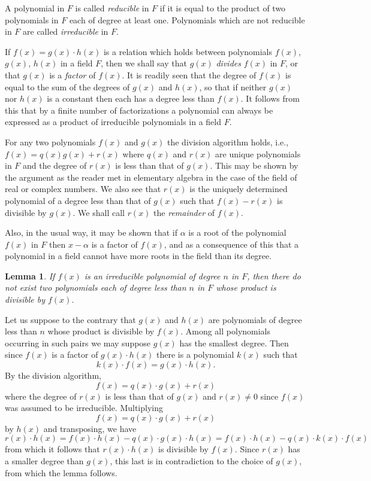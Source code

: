 \documentclass[11pt]{article}
\newtheorem*{lemm}{Lemma}
\theoremstyle{definition}
\begin{document}
A polynomial in $F$ is called \emph{reducible} in $F$ if it is equal to the product of two polynomials in $F$ each of degree at least one.
Polynomials which are not reducible in $F$ are called \emph{irreducible} in $F$.

If $f(x) = g(x) \cdot h(x)$ is a relation which holds between polynomials $f(x)$, $g(x)$, $h(x)$ in a field $F$, then we shall say that $g(x)$ \emph{divides} $f(x)$ in $F$, or that $g(x)$ is a \emph{factor} of $f(x)$.
It is readily seen that the degree of $f(x)$ is equal to the sum of the degrees of $g(x)$ and $h(x)$, so that if neither $g(x)$ nor $h(x)$ is a constant then each has a degree less than $f(x)$.
It follows from this that by a finite number of factorizations a polynomial can always be expressed as a product of irreducible polynomials in a field $F$.

For any two polynomials $f(x)$ and $g(x)$ the division algorithm holds, i.e., $f(x) = q(x) g(x) + r(x)$ where $q(x)$ and $r(x)$ are unique polynomials in $F$ and the degree of $r(x)$ is less than that of $g(x)$.
This may be shown by the argument as the reader met in elementary algebra in the case of the field of real or complex numbers.
We also see that $r(x)$ is the uniquely determined polynomial of a degree less than that of $g(x)$ such that $f(x) - r(x)$ is divisible by $g(x)$.
We shall call $r(x)$ the \emph{remainder} of $f(x)$.

Also, in the usual way, it may be shown that if $\alpha$ is a root of the polynomial $f(x)$ in $F$ then $x - \alpha$ is a factor of $f(x)$, and as a consequence of this that a polynomial in a field cannot have more roots in the field than its degree.


\begin{lemm}
\label{lemm:p24}
If $f(x)$ is an irreducible polynomial of degree $n$ in $F$, then there do not exist two polynomials each of degree less than $n$ in $F$ whose product is divisible by $f(x)$.
\end{lemm}

Let us suppose to the contrary that $g(x)$ and $h(x)$ are polynomials of degree less than $n$ whose product is divisible by $f(x)$.
Among all polynomials occurring in such pairs we may suppose $g(x)$ has the smallest degree.
Then since $f(x)$ is a factor of $g(x) \cdot h(x)$ there is a polynomial $k(x)$ such that
\[
k(x) \cdot f(x) = g(x) \cdot h(x).
\]
By the division algorithm,
\[
f(x) = q(x) \cdot g(x) + r(x)
\]
where the degree of $r(x)$ is less than that of $g(x)$ and $r(x) \not= 0$ since $f(x)$ was assumed to be irreducible.
Multiplying
\[
f(x) = q(x) \cdot g(x) + r(x)
\]
by $h(x)$ and transposing, we have
\[
r(x) \cdot h(x)
= f(x) \cdot h(x) - q(x) \cdot g(x) \cdot h(x)
= f(x) \cdot h(x) - q(x) \cdot k(x) \cdot f(x)
\]
from which it follows that $r(x) \cdot h(x)$ is divisible by $f(x)$.
Since $r(x)$ has a smaller degree than $g(x)$, this last is in contradiction to the choice of $g(x)$, from which the lemma follows.
\end{document}
